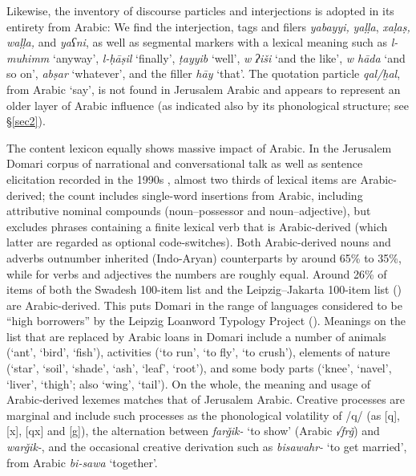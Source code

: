 \documentclass[output=paper]{langsci/langscibook}
\begin{document}
Likewise, the inventory of discourse particles and interjections is adopted in its entirety from Arabic: We find the interjection, tags and filers \textit{yabayyi,} \textit{yaḷḷa}, \textit{xaḷaṣ, waḷḷa,} {{and}} \textit{yaʕni}, as well as segmental markers with a lexical meaning such as \textit{l\nobreakdash-muhimm} ‘anyway’, \textit{l-ḥāṣil} ‘finally’, \textit{ṭayyib} ‘well’, \textit{w ʔiši} ‘and the like’, \textit{w hāda} ‘and so on’, \textit{abṣar} ‘whatever’, and the filler \textit{hāy} ‘that’. The quotation particle \textit{qal/ḫal}, from Arabic ‘say’, is not found in Jerusalem Arabic and appears to represent an older layer of Arabic influence (as indicated also by its phonological structure; see §\ref{sec2}). 

The content lexicon equally shows massive impact of Arabic. In the Jerusalem Domari corpus of narrational and conversational talk as well as sentence elicitation recorded in the 1990s \citep{Matras2012}, almost two thirds of lexical items are Arabic-derived; the count includes single-word insertions from Arabic, including attributive nominal compounds (noun–possessor and noun–adjective), but excludes phrases containing a finite lexical verb that is Arabic-derived (which latter are regarded as optional code-switches). Both Arabic-derived nouns and adverbs outnumber inherited (Indo-Aryan) counterparts by around 65\% to 35\%, while for verbs and adjectives the numbers are roughly equal. Around 26\% of items of both the Swadesh 100-item list and the Leipzig–Jakarta 100-item list (\citealt{HaspelmathTadmor2009}) are Arabic-derived. This puts Domari in the range of languages considered to be ``high borrowers'' by the Leipzig Loanword Typology Project (\citealt{HaspelmathTadmor2009}). Meanings on the list that are replaced by Arabic loans in Domari include a number of animals (‘ant’, ‘bird’, ‘fish’), activities (‘to run’, ‘to fly’, ‘to crush’), elements of nature (‘star’, ‘soil’, ‘shade’, ‘ash’, ‘leaf’, ‘root’), and some body parts (‘knee’, ‘navel’, ‘liver’, ‘thigh’; also ‘wing’, ‘tail’). On the whole, the meaning and usage of Arabic-derived lexemes matches that of Jerusalem Arabic. Creative processes are marginal and include such processes as the phonological volatility of /q/ (as [q], [x], [qx] and [g]), the alternation between \textit{farǧik-} ‘to show’ (Arabic \textit{√frǧ}) and \textit{warǧik-}, and the occasional creative derivation such as \textit{bisawahr-} ‘to get married’, from Arabic \textit{bi-sawa} ‘together’. 
\end{document}
